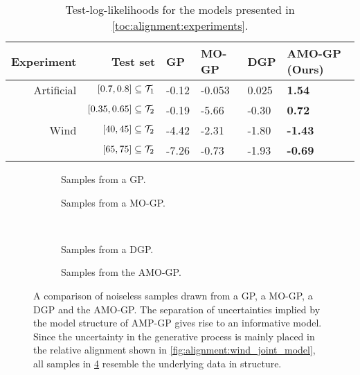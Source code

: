 \begin{table}[t]
    \centering
    \caption{
        \label{tab:alignment:dampened_sine_model_log_likelihoods}
        Test-log-likelihoods for the models presented in \cref{toc:alignment:experiments}.
    }
    \begin{tabularx}{\linewidth}{rrYYYY}
        \toprule
        Experiment & Test set                       & GP    & MO-GP  & DGP   & AMO-GP (Ours)  \\
        \midrule
        Artificial & $[0.7, 0.8] \subseteq \mathcal{T}_1$   & -0.12 & -0.053 & 0.025 & \textbf{1.54}  \\
                   & $[0.35, 0.65] \subseteq \mathcal{T}_2$ & -0.19 & -5.66  & -0.30 & \textbf{0.72}  \\
        \midrule
        Wind       & $[40, 45] \subseteq \mathcal{T}_2 $    & -4.42 & -2.31  & -1.80 & \textbf{-1.43} \\
                   & $[65, 75] \subseteq \mathcal{T}_2 $    & -7.26 & -0.73  & -1.93 & \textbf{-0.69} \\
        \bottomrule
    \end{tabularx}
\end{table}
\begin{figure}[t]
    \centering
    \begin{subfigure}[b]{\halffigurewidth}
        \centering
        \caption{
            \label{fig:alignment:wind_samples:a}
            Samples from a GP.
        }
    \end{subfigure}
    \hfill
    \begin{subfigure}[b]{\halffigurewidth}
        \centering
        \caption{
            \label{fig:alignment:wind_samples:b}
            Samples from a MO-GP.
        }
    \end{subfigure}\\[\figureskip]
    \begin{subfigure}[b]{\halffigurewidth}
        \centering
        \caption{
            \label{fig:alignment:wind_samples:c}
            Samples from a DGP.
        }
    \end{subfigure}
    \hfill
    \begin{subfigure}[b]{\halffigurewidth}
        \centering
        \caption{
            \label{fig:alignment:wind_samples:d}
            Samples from the AMO-GP.
        }
    \end{subfigure}
    \caption{
        \label{fig:alignment:wind_samples}
        A comparison of noiseless samples drawn from a GP, a MO-GP, a DGP and the AMO-GP.
        The separation of uncertainties implied by the model structure of AMP-GP gives rise to an informative model.
        Since the uncertainty in the generative process is mainly placed in the relative alignment shown in \cref{fig:alignment:wind_joint_model}, all samples in \cref{fig:alignment:wind_samples:d} resemble the underlying data in structure.
    }
\end{figure}
